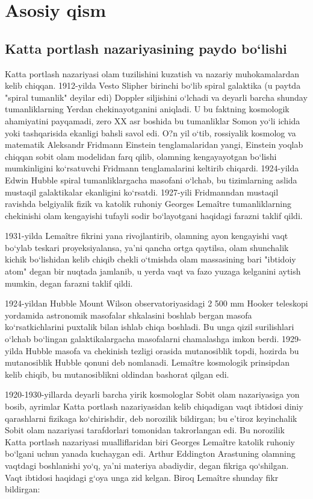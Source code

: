 \documentclass[14pt]{scrartcl}
\begin{document}
\section{Asosiy qism}
\subsection{Katta portlash nazariyasining paydo bo`lishi}
\hspace{0.6cm}
Katta portlash nazariyasi olam tuzilishini kuzatish va nazariy muhokamalardan kelib chiqqan. 1912-yilda Vesto Slipher birinchi bo`lib spiral galaktika (u paytda "spiral tumanlik" deyilar edi) Doppler siljishini o`lchadi va deyarli barcha shunday tumanliklarning Yerdan chekinayotganini aniqladi. U bu faktning kosmologik ahamiyatini payqamadi, zero XX asr boshida bu tumanliklar Somon yo`li ichida yoki tashqarisida ekanligi bahsli savol edi.  O?n yil o`tib, rossiyalik kosmolog va matematik Aleksandr Fridmann Einstein tenglamalaridan yangi, Einstein yoqlab chiqqan sobit olam modelidan farq qilib, olamning kengayayotgan bo`lishi mumkinligini ko`rsatuvchi Fridmann tenglamalarini keltirib chiqardi.  1924-yilda Edwin Hubble spiral tumanliklargacha masofani o`lchab, bu tizimlarning aslida mustaqil galaktikalar ekanligini ko`rsatdi. 1927-yili Fridmanndan mustaqil ravishda belgiyalik fizik va katolik ruhoniy Georges Lema\^{i}tre tumanliklarning chekinishi olam kengayishi tufayli sodir bo`layotgani haqidagi farazni taklif qildi. 

1931-yilda Lema\^{i}tre fikrini yana rivojlantirib, olamning ayon kengayishi vaqt bo`ylab teskari proyeksiyalansa, ya'ni qancha ortga qaytilsa, olam shunchalik kichik bo`lishidan kelib chiqib chekli o`tmishda olam massasining bari "ibtidoiy atom" degan bir nuqtada jamlanib, u yerda vaqt va fazo yuzaga kelganini aytish mumkin, degan farazni taklif qildi. 

1924-yildan Hubble Mount Wilson observatoriyasidagi 2 500 mm Hooker teleskopi yordamida astronomik masofalar shkalasini boshlab bergan masofa ko`rsatkichlarini puxtalik bilan ishlab chiqa boshladi. Bu unga qizil surilishlari o`lchab bo`lingan galaktikalargacha masofalarni chamalashga imkon berdi. 1929-yilda Hubble masofa va chekinish tezligi orasida mutanosiblik topdi, hozirda bu mutanosiblik Hubble qonuni deb nomlanadi.  Lema\^{i}tre kosmologik prinsipdan kelib chiqib, bu mutanosiblikni oldindan bashorat qilgan edi. 

1920-1930-yillarda deyarli barcha yirik kosmologlar Sobit olam nazariyasiga yon bosib, ayrimlar Katta portlash nazariyasidan kelib chiqadigan vaqt ibtidosi diniy qarashlarni fizikaga ko`chirishdir, deb norozilik bildirgan; bu e'tiroz keyinchalik Sobit olam nazariyasi tarafdorlari tomonidan takrorlangan edi.  Bu norozilik Katta portlash nazariyasi mualliflaridan biri Georges Lema\^{i}tre katolik ruhoniy bo`lgani uchun yanada kuchaygan edi.  Arthur Eddington Arastuning olamning vaqtdagi boshlanishi yo`q, ya'ni materiya abadiydir, degan fikriga qo`shilgan. Vaqt ibtidosi haqidagi g`oya unga zid kelgan.  Biroq Lema\^{i}tre shunday fikr bildirgan:
\end{document}
